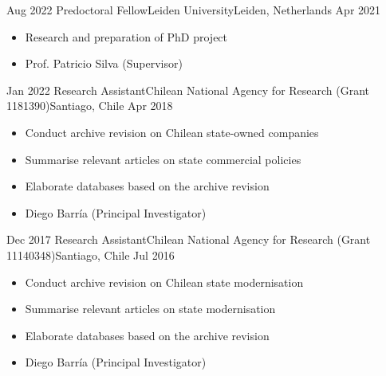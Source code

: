 \begin{experiences}
  \emptySeparator 
  \experience 
    {Aug 2022} {Predoctoral Fellow}{Leiden University}{Leiden, Netherlands} {Apr 2021}
    {\begin{itemize}
    \item Research and preparation of PhD project
    \item Prof. Patricio Silva {\small (Supervisor)}
    \end{itemize}}
    {}
\end{experiences}
\vspace{-2mm}

\begin{experiences}
  \emptySeparator 
  \experience 
    {Jan 2022} {Research Assistant}{Chilean National Agency for Research (Grant 1181390)}{Santiago, Chile} {Apr 2018}
    {\begin{itemize}
    \item Conduct archive revision on Chilean state-owned companies
    \item Summarise relevant articles on state commercial policies
    \item Elaborate databases based on the archive revision
    \item Diego Barría {\small (Principal Investigator)}
    \end{itemize}}
    {}
\end{experiences}
\vspace{-2mm}

\begin{experiences}
  \emptySeparator 
  \experience 
    {Dec 2017} {Research Assistant}{Chilean National Agency for Research (Grant 11140348)}{Santiago, Chile} {Jul 2016}
    {\begin{itemize}
    \item Conduct archive revision on Chilean state modernisation
    \item Summarise relevant articles on state modernisation
    \item Elaborate databases based on the archive revision
    \item Diego Barría {\small (Principal Investigator)}
    \end{itemize}}
    {}
\end{experiences}
\vspace{-2mm}

